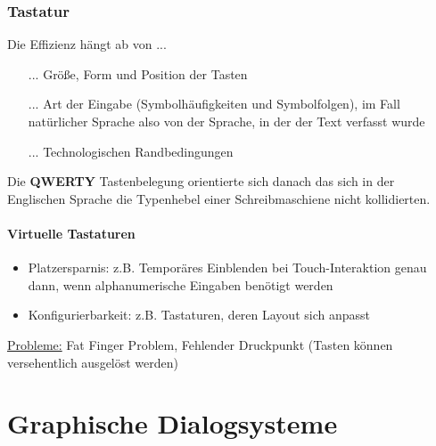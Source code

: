 \documentclass[8pt,a4paper,landscape]{extarticle}
\begin{document}
\begin{multicols*}{4}
	\subsubsection{Tastatur}
	Die Effizienz hängt ab von ...
	\begin{itemize}
		\item[...] Größe, Form und Position der Tasten
		\item[...] Art der Eingabe (Symbolhäufigkeiten und Symbolfolgen), im
		      Fall natürlicher Sprache also von der Sprache, in der der Text
		      verfasst wurde
		\item[...] Technologischen Randbedingungen
	\end{itemize}
	Die \textbf{QWERTY} Tastenbelegung orientierte sich danach das sich in der
	Englischen Sprache die Typenhebel einer Schreibmaschiene nicht kollidierten.
	\paragraph{Virtuelle Tastaturen}
	\begin{itemize}
		\item Platzersparnis: z.B. Temporäres Einblenden bei Touch-Interaktion
		      genau dann, wenn alphanumerische Eingaben benötigt werden
		\item Konfigurierbarkeit: z.B. Tastaturen, deren Layout sich anpasst
	\end{itemize}
	\underline{Probleme:} Fat Finger Problem, Fehlender Druckpunkt
	(Tasten können versehentlich ausgelöst werden)
	\section{Graphische Dialogsysteme}

\end{multicols*}
\end{document}
